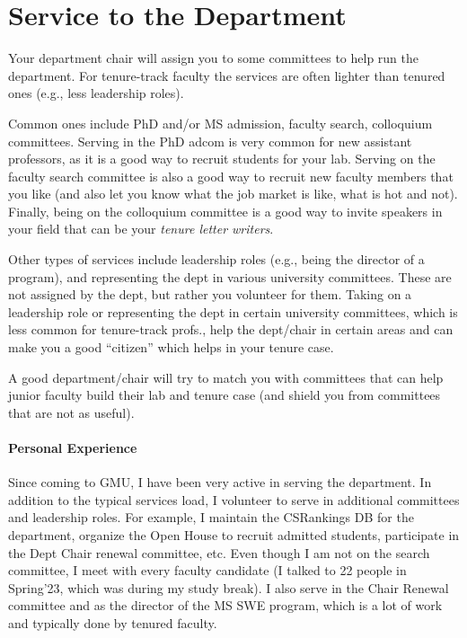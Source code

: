 \documentclass[oneside,11pt,dvipsnames]{book}
\begin{document}
\section{Service to the Department}\label{sec:services-dept}
Your department chair will assign you to some committees to help run the department.  For tenure-track faculty the services are often lighter than tenured ones (e.g., less leadership roles). 

Common ones include PhD and/or MS admission, faculty search,  colloquium committees. Serving in the PhD adcom is very common for new assistant professors, as it is a good way to recruit students for your lab. Serving on the faculty search committee is also a good way to recruit new faculty members that you like (and also let you know what the job market is like, what is hot and not). Finally, being on the colloquium committee is a good way to invite speakers in your field that can be your \emph{tenure letter writers}.

Other types of services include leadership roles (e.g., being the director of a program), and representing the dept in various university committees.
These are not assigned by the dept, but rather you volunteer for them. Taking on a leadership role or representing the dept in certain university committees, which is less common for tenure-track profs., help the dept/chair in certain areas and can make you a good ``citizen'' which helps in your tenure case.

A good department/chair will try to match you with committees that can help junior faculty build their lab and tenure case (and shield you from committees that are not as useful).


\paragraph{Personal Experience} Since coming to GMU, I have been very active in serving the department.  In addition to the typical services load, I volunteer to serve in additional committees and leadership roles. For example, I maintain the CSRankings DB for the department, organize the Open House to recruit admitted students, participate in the Dept Chair renewal committee, etc.
Even though I am not on the search committee, I meet with every faculty candidate (I talked to 22 people in Spring'23, which was during my study break). I also serve in the Chair Renewal committee and as the director of the MS SWE program, which is a lot of work and typically done by tenured faculty. 
\end{document}
